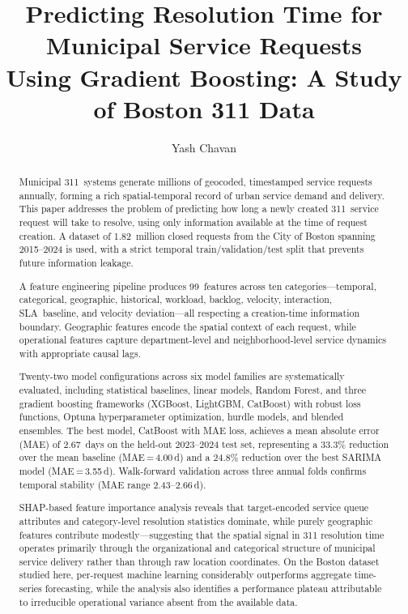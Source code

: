 \documentclass[sigconf,nonacm]{acmart}
\begin{document}
\title{Predicting Resolution Time for Municipal Service Requests\\
Using Gradient Boosting: A Study of Boston 311 Data}

\author{Yash Chavan}

\begin{abstract}
Municipal 311~systems generate millions of geocoded, timestamped
service requests annually, forming a rich spatial-temporal record
of urban service demand and delivery. This paper addresses the
problem of predicting how long a newly created 311~service request
will take to resolve, using only information available at the time
of request creation. A dataset of 1.82~million closed requests
from the City of Boston spanning 2015--2024 is used, with a strict
temporal train/validation/test split that prevents future
information leakage.

A feature engineering pipeline produces 99~features across ten
categories---temporal, categorical, geographic, historical,
workload, backlog, velocity, interaction, SLA~baseline, and
velocity deviation---all respecting a creation-time information
boundary. Geographic features encode the spatial context of each
request, while operational features capture department-level and
neighborhood-level service dynamics with appropriate causal lags.

Twenty-two model configurations across six model families are
systematically evaluated, including statistical baselines, linear
models, Random Forest, and three gradient boosting frameworks
(XGBoost, LightGBM, CatBoost) with robust loss functions, Optuna
hyperparameter optimization, hurdle models, and blended ensembles.
The best model, CatBoost with MAE loss, achieves a mean absolute
error (MAE) of 2.67~days on the held-out 2023--2024 test set,
representing a 33.3\% reduction over the mean baseline
(MAE\,=\,4.00\,d) and a 24.8\% reduction over the best
SARIMA model (MAE\,=\,3.55\,d). Walk-forward validation across
three annual folds confirms temporal stability
(MAE range 2.43--2.66\,d).

SHAP-based feature importance analysis reveals that
target-encoded service queue attributes and category-level
resolution statistics dominate, while purely geographic features
contribute modestly---suggesting that the spatial signal in
311 resolution
time operates primarily through the organizational and categorical
structure of municipal service delivery rather than through raw
location coordinates. On the Boston dataset studied here, per-request
machine learning considerably outperforms aggregate time-series
forecasting, while the analysis also identifies a performance
plateau attributable to irreducible operational variance absent
from the available data.
\end{abstract}
\end{document}
